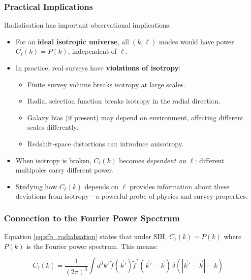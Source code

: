 \subsubsection{Practical Implications}

Radialisation has important observational implications:

\begin{itemize}
    \item For an \textbf{ideal isotropic universe}, all $(k, \ell)$ modes would have power $C_\ell(k) = P(k)$, independent of $\ell$.
    
    \item In practice, real surveys have \textbf{violations of isotropy}:
    \begin{itemize}
        \item Finite survey volume breaks isotropy at large scales.
        \item Radial selection function breaks isotropy in the radial direction.
        \item Galaxy bias (if present) may depend on environment, affecting different scales differently.
        \item Redshift-space distortions can introduce anisotropy.
    \end{itemize}
    
    \item When isotropy is broken, $C_\ell(k)$ becomes \emph{dependent on $\ell$}: different multipoles carry different power.
    
    \item Studying how $C_\ell(k)$ depends on $\ell$ provides information about these deviations from isotropy---a powerful probe of physics and survey properties.
\end{itemize}

\subsubsection{Connection to the Fourier Power Spectrum}

Equation \eqref{eq:sfb_radialisation} states that under SIH, $C_\ell(k) = P(k)$ where $P(k)$ is the Fourier power spectrum. This means:

\begin{equation}
C_\ell(k) = \frac{1}{(2\pi)^3} \int d^3 k' \, \tilde{f}(\vec{k}') \tilde{f}^*(\vec{k}' - \vec{k}) \, \delta(|\vec{k}' - \vec{k}| - k)
\end{equation}

